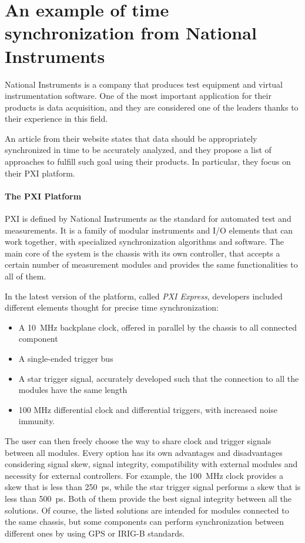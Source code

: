 \section{An example of time synchronization from National Instruments}

National Instruments is a company that produces test equipment and virtual instrumentation software. One of the most important application for their products is data acquisition, and  they are considered one of the leaders thanks to their experience in this field. 

An article from their website \cite{NISync} states that data should be appropriately synchronized in time to be accurately analyzed, and they propose a list of approaches to fulfill such goal using their products. In particular, they focus on their PXI platform.

\paragraph{The PXI Platform} PXI is defined by National Instruments as the standard for automated test and measurements. It is a family of modular instruments and I/O elements that can work together, with specialized synchronization algorithms and software. The main core of the system is the chassis with its own controller, that accepts a certain number of measurement modules and provides the same functionalities to all of them. 

In the latest version of the platform, called \textit{PXI Express}, developers included different elements thought for precise time synchronization:
\begin{itemize}
    \item A 10~MHz backplane clock, offered in parallel by the chassis to all connected component
    \item A single-ended trigger bus
    \item A star trigger signal, accurately developed such that the connection to all the modules have the same length
    \item 100 MHz differential clock and differential triggers, with increased noise immunity. 
\end{itemize}
The user can then freely choose the way to share clock and trigger signals between all modules. Every option has its own advantages and disadvantages considering signal skew, signal integrity, compatibility with external modules and necessity for external controllers.
For example, the 100~MHz clock provides a skew that is less than 250~ps, while the star trigger signal performs a skew that is less than 500~ps. Both of them provide the best signal integrity between all the solutions. 
Of course, the listed solutions are intended for modules connected to the same chassis, but some components can perform synchronization between different ones by using GPS or IRIG-B standards.  

